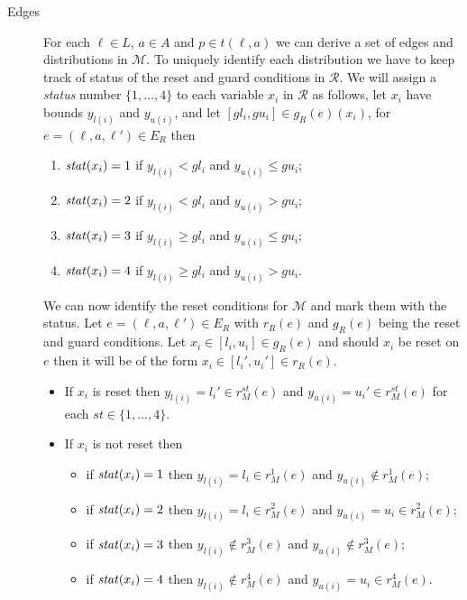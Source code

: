 \begin{description}
    \item[Edges] For each $\ell\in L$, $a\in A$ and $p\in t(\ell,a)$ we can derive a set of edges and distributions in $\mathcal{M}$. To uniquely identify each distribution we have to keep track of status of the reset and guard conditions in $\mathcal{R}$.
    We will assign a \emph{status} number $\{1,\ldots,4\}$ to each variable $x_{i}$ in $\mathcal{R}$ as follows, let $x_{i}$ have bounds $y_{l(i)}$ and $y_{u(i)}$, and let $[gl_{i},gu_{i}]\in g_{R}(e)(x_{i})$, for $e=(\ell,a,\ell')\in E_{R}$ then
    \begin{enumerate}
        \item $\mathit{stat}(x_{i})=1$ if $y_{l(i)} < gl_{i}$ and $y_{u(i)} \leq gu_{i}$;
        \item $\mathit{stat}(x_{i})=2$ if $y_{l(i)} < gl_{i}$ and $y_{u(i)} > gu_{i}$;
        \item $\mathit{stat}(x_{i})=3$ if $y_{l(i)} \geq gl_{i}$ and $y_{u(i)} \leq gu_{i}$;
        \item $\mathit{stat}(x_{i})=4$ if $y_{l(i)} \geq gl_{i}$ and $y_{u(i)} > gu_{i}$.
    \end{enumerate}
    We can now identify the reset conditions for $\mathcal{M}$ and mark them with the status. Let $e=(\ell,a,\ell')\in E_{R}$ with $r_{R}(e)$ and $g_{R}(e)$ being the reset and guard conditions. Let $x_{i}\in[l_{i},u_{i}]\in g_{R}(e)$ and should $x_{i}$ be
    reset on $e$ then it will be of the form $x_{i}\in[l_{i}',u_{i}']\in r_{R}(e)$.
    \begin{itemize}
        \item If $x_{i}$ is reset then $y_{l(i)}=l_{i}'\in r_{M}^{st}(e)$ and $y_{u(i)}=u_{i}'\in r_{M}^{st}(e)$ for each $st\in\{1,\ldots,4\}$.
        \item If $x_{i}$ is not reset then
            \begin{itemize}
                \item if $\mathit{stat}(x_{i})=1$ then $y_{l(i)}=l_{i}\in r_{M}^{1}(e)$ and $y_{u(i)}\notin r_{M}^{1}(e)$;
                \item if $\mathit{stat}(x_{i})=2$ then $y_{l(i)}=l_{i}\in r_{M}^{2}(e)$ and $y_{u(i)}=u_{i}\in r_{M}^{2}(e)$;
                \item if $\mathit{stat}(x_{i})=3$ then $y_{l(i)}\notin r_{M}^{3}(e)$ and $y_{u(i)}\notin r_{M}^{3}(e)$;
                \item if $\mathit{stat}(x_{i})=4$ then $y_{l(i)}\notin r_{M}^{4}(e)$ and $y_{u(i)}=u_{i}\in r_{M}^{4}(e)$.
            \end{itemize}
    \end{itemize}

\end{description}
